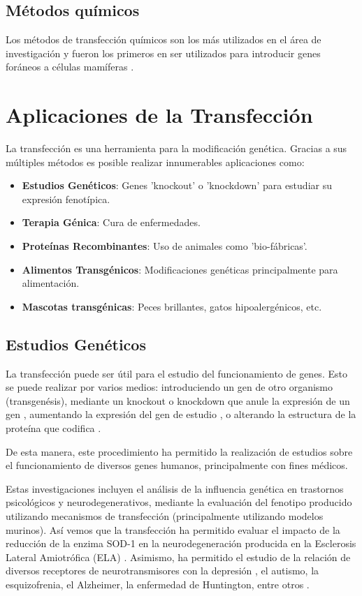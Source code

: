 \documentclass[fleqn,10pt]{SelfArx} %
\begin{document}
\subsection{Métodos químicos}
Los métodos de transfección químicos son los más utilizados en el área de investigación y fueron los primeros en ser utilizados para introducir genes foráneos a células mamíferas \cite{Schenborn2000}. 

\section{Aplicaciones de la Transfección}

La transfección es una herramienta para la modificación genética. Gracias a sus múltiples métodos es posible realizar innumerables aplicaciones como:
\begin{itemize}[noitemsep] %
\item \textbf{Estudios Genéticos}: Genes 'knockout' o 'knockdown' para estudiar su expresión fenotípica.
\item \textbf{Terapia Génica}: Cura de enfermedades.
\item \textbf{Proteínas Recombinantes}: Uso de animales como 'bio-fábricas'.
\item \textbf{Alimentos Transgénicos}: Modificaciones genéticas principalmente para alimentación.
\item \textbf{Mascotas transgénicas}: Peces brillantes, gatos hipoalergénicos, etc.
\end{itemize}

\subsection{Estudios Genéticos}

La transfección puede ser útil para el estudio del funcionamiento de genes. Esto se puede realizar por varios medios: introduciendo un gen de otro organismo (transgenésis), mediante un knockout o knockdown que anule la expresión de un gen \cite{cryanin2004}, aumentando la expresión del gen de estudio \cite{yanni2004laboratory}, o alterando la estructura de la proteína que codifica \cite{ripps1995transgenic}.

De esta manera, este procedimiento ha permitido la realización de estudios sobre el funcionamiento de diversos genes humanos, principalmente con fines médicos.

Estas investigaciones incluyen el análisis de la influencia genética en trastornos psicológicos y neurodegenerativos, mediante la evaluación del fenotipo producido utilizando mecanismos de transfección (principalmente utilizando modelos murinos). Así vemos que la transfección ha permitido evaluar el impacto de la reducción de la enzima SOD-1 en la neurodegeneración producida en la Esclerosis Lateral Amiotrófica (ELA) \cite{ripps1995transgenic}. Asimismo, ha permitido el estudio de la relación de diversos receptores de neurotransmisores con la depresión \cite{cryanin2004}, el autismo, la esquizofrenia, el Alzheimer, la enfermedad de Huntington, entre otros \cite{anthe2002}.
\end{document}
